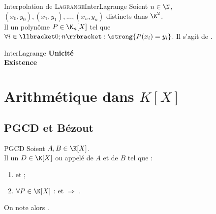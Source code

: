\documentclass[12pt,a4paper]{report}
\begin{document}
        
        \begin{theoreme}{Interpolation de \textsc{Lagrange}}{InterLagrange}
        Soient $n \in \N$, $(x_0, y_0), (x_1, y_1), ..., (x_n, y_n)$ distincts dans $\K^2$.\\
        Il  un  polynôme $P \in \K_n[X]$ tel que $\forall i \in \llbracket 0 ; n \rrbracket : \strong{P(x_i) = y_i}$. Il s'agit de .
        \end{theoreme}
    
        \begin{principedemo}{InterLagrange}
        \textbf{Unicité}\\
        \textbf{Existence}
        \end{principedemo}



\section{Arithmétique dans $K[X]$}
    \subsection{PGCD et Bézout}
        \begin{theoreme}{PGCD}{}
        Soient $A, B \in \K[X]$.\\
        Il  un  $D \in \K[X]$  ou  appelé  de $A$ et de $B$ tel que :
        \begin{multicols}{2}
        \begin{enumerate}
        \item {} et  ;
        \item $\forall P \in \K[X]$ :  et  $\Rightarrow$ .
        \end{enumerate}
        \end{multicols}
        On note alors .
        \end{theoreme}
        
\end{document}
